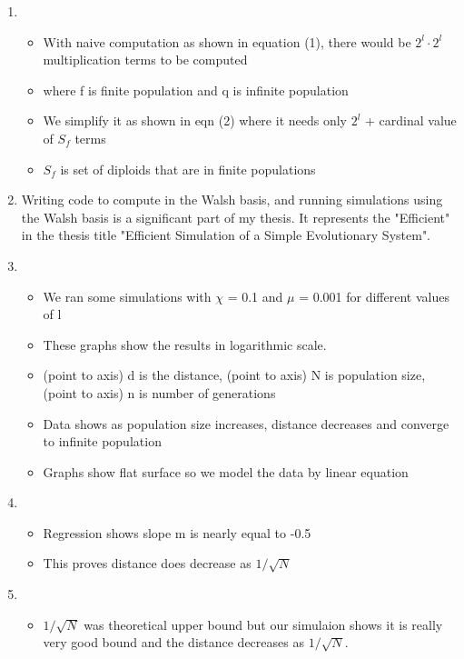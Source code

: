 \documentclass{article}
\begin{document}
\begin{enumerate}
\item
  \begin{itemize}
  \item With naive computation as shown in equation (1), there would
    be $2^l \cdot 2^l$ multiplication terms to be computed
  \item where f is finite population and q is infinite population
  \item We simplify it as shown in eqn (2) where it needs only $2^l$ +
    cardinal value of $S_f$ terms
  \item $S_f$ is set of diploids that are in finite populations
  \end{itemize}
  \item Writing code to compute in the Walsh basis, and running simulations using the Walsh basis 
  is a significant part of my thesis. It represents the "Efficient" in the thesis title "Efficient Simulation of a Simple Evolutionary System".
  
\item
  \begin{itemize}
  \item We ran some simulations with $\chi$ = 0.1 and $\mu$ = 0.001 for
    different values of l
  \item These graphs show the results in logarithmic scale.
  \item  (point to axis) d is the distance, (point to axis) N is population size, (point to axis) n is number of
    generations
  \item Data shows as population size increases, distance decreases and 
    converge to infinite population
  \item Graphs show flat surface so we model the data by linear equation  
  \end{itemize}
    
\item
  \begin{itemize}
  \item Regression shows slope m is nearly equal to -0.5
  \item This proves distance does decrease as $1/\sqrt{N}$  
  \end{itemize}

\item
  \begin{itemize}
  \item $1/\sqrt{N}$ was theoretical upper bound 
  but our simulaion shows it is really very good bound 
  and the distance decreases as $1/\sqrt{N}$. 
  \end{itemize}
    

\end{enumerate}
\end{document}
